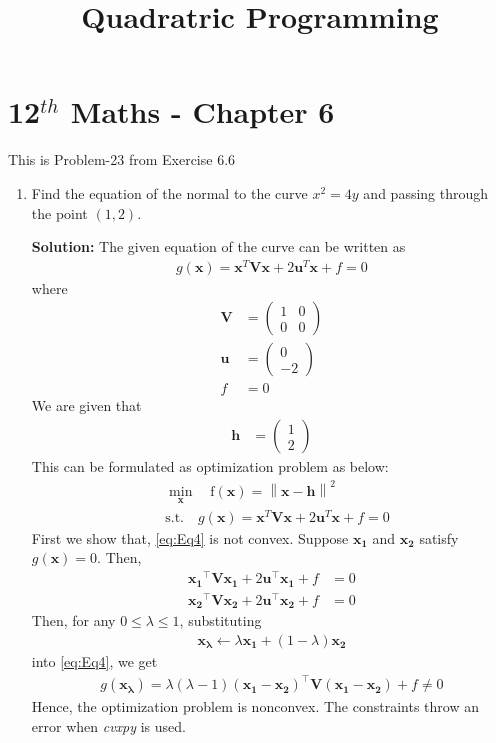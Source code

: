 \documentclass[12pt]{article}
\providecommand{\brak}[1]{\ensuremath{\left(#1\right)}}
\providecommand{\norm}[1]{\left\lVert#1\right\rVert}
\newcommand{\solution}{\noindent \textbf{Solution: }}
\newcommand{\myvec}[1]{\ensuremath{\begin{pmatrix}#1\end{pmatrix}}}
\let\vec\mathbf
\begin{document}
\begin{center}
	\title{\textbf{Quadratric Programming}}
\date{\vspace{-5ex}} %
\maketitle
\end{center}
\setcounter{page}{1}

\section{12$^{th}$ Maths - Chapter 6}
This is Problem-23 from Exercise 6.6 
\begin{enumerate}
	\item Find the equation of the normal to the curve $x^2=4y$ and passing through the point $(1,2)$.

\solution 
The given equation of the curve can be written as  
\begin{align}
	\label{eq:parabolaEq2}
	g\brak{\vec{x}} = \vec{x}^T\vec{V}\vec{x} + 2\vec{u}^T\vec{x} + f = 0 
\end{align}
where
\begin{align}
	\label{eq:eqV}
	\vec{V} &= \myvec{ 1 & 0 \\ 0 & 0} \\
	\label{eq:eqU}
	\vec{u} &= \myvec{0 \\ -2} \\
	\label{eq:eqF}
	f &= 0 
\end{align}
We are given that 
\begin{align}
	\vec{h} &= \myvec{1 \\ 2}
\end{align}
This can be formulated as optimization problem as below:
\begin{align}
	\label{eq:Eq3}
	&  \min_{\vec{x}} \quad \text{f}\brak{\vec{x}} = \norm{\vec{x}-\vec{h}}^2\\
	\label{eq:Eq4}
	& \text{s.t.}\quad g\brak{\vec{x}} = \vec{x}^T\vec{V}\vec{x} + 2\vec{u}^T\vec{x} + f = 0  
\end{align}
First we show that, \eqref{eq:Eq4} is not convex. Suppose 
    $\vec{x_1}$ and $\vec{x_2}$ satisfy $g\brak{\vec{x}} = 0$. Then, 
\begin{align}
        \vec{x_1}^\top\vec{Vx_1} + 2\vec{u}^\top\vec{x_1} + f &= 0 \label{eq:x1-parab} \\
        \vec{x_2}^\top\vec{Vx_2} + 2\vec{u}^\top\vec{x_2} + f &= 0 \label{eq:x2-parab}
\end{align}
Then, for any $0 \le \lambda \le 1$, substituting
\begin{align}
       \vec{x_\lambda} \leftarrow \lambda\vec{x_1} + \brak{1-\lambda}\vec{x_2}
\end{align}
into \eqref{eq:Eq4}, we get
\begin{align}
        g\brak{\vec{x_\lambda}} = \lambda\brak{\lambda-1}\brak{\vec{x_1}-\vec{x_2}}^\top\vec{V}\brak{\vec{x_1}-\vec{x_2}} + f \neq 0
        \label{eq:nonconvex}
\end{align}
Hence, the optimization problem is nonconvex. The constraints throw an error when \textit{cvxpy} is used. 


\end{enumerate}
\end{document}
